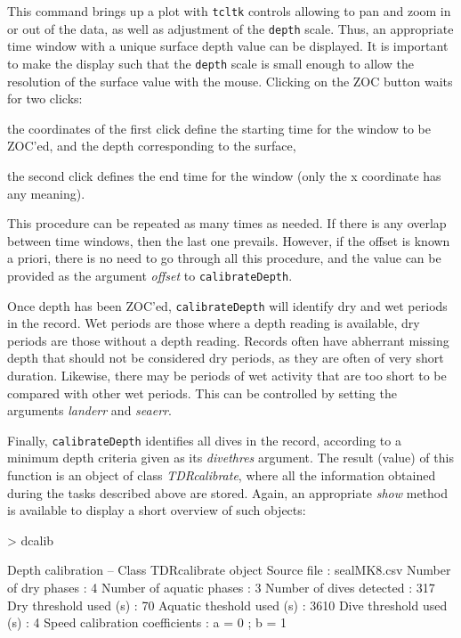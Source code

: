 \documentclass[12pt, letterpaper]{scrartcl}
\newcommand{\Robject}[1]{{\texttt{#1}}}
\newcommand{\Rfunction}[1]{{\texttt{#1}}}
\newcommand{\Rpackage}[1]{{\texttt{#1}}}
\newcommand{\Rclass}[1]{{\textit{#1}}}
\newcommand{\Rmethod}[1]{{\textit{#1}}}
\newcommand{\Rfunarg}[1]{{\textit{#1}}}
\begin{document}
This command brings up a plot with \Rpackage{tcltk} controls allowing to
pan and zoom in or out of the data, as well as adjustment of the
\Robject{depth} scale.  Thus, an appropriate time window with a unique
surface depth value can be displayed.  It is important to make the display
such that the \Robject{depth} scale is small enough to allow the
resolution of the surface value with the mouse.  Clicking on the ZOC
button waits for two clicks:
\begin{compactenum}
\item the coordinates of the first click define the starting time for the
  window to be ZOC'ed, and the depth corresponding to the surface,
\item the second click defines the end time for the window (only the x
  coordinate has any meaning).
\end{compactenum}
This procedure can be repeated as many times as needed.  If there is any
overlap between time windows, then the last one prevails.  However, if the
offset is known a priori, there is no need to go through all this
procedure, and the value can be provided as the argument \Rfunarg{offset}
to \Rfunction{calibrateDepth}.

Once depth has been ZOC'ed, \Rfunction{calibrateDepth} will identify dry
and wet periods in the record.  Wet periods are those where a depth
reading is available, dry periods are those without a depth reading.
Records often have abherrant missing depth that should not be considered
dry periods, as they are often of very short duration.  Likewise, there
may be periods of wet activity that are too short to be compared with
other wet periods.  This can be controlled by setting the arguments
\Rfunarg{landerr} and \Rfunarg{seaerr}.

Finally, \Rfunction{calibrateDepth} identifies all dives in the record,
according to a minimum depth criteria given as its \Rfunarg{divethres}
argument.  The result (value) of this function is an object of class
\Rclass{TDRcalibrate}, where all the information obtained during the tasks
described above are stored.  Again, an appropriate \Rmethod{show} method
is available to display a short overview of such objects:
\begin{Schunk}
\begin{Sinput}
> dcalib
\end{Sinput}
\begin{Soutput}
Depth calibration -- Class TDRcalibrate object
  Source file                       : sealMK8.csv 
  Number of dry phases              : 4 
  Number of aquatic phases          : 3 
  Number of dives detected          : 317 
  Dry threshold used (s)            : 70 
  Aquatic theshold used (s)         : 3610 
  Dive threshold used (s)           : 4 
  Speed calibration coefficients    : a = 0 ; b = 1 
\end{Soutput}
\end{Schunk}
\end{document}
